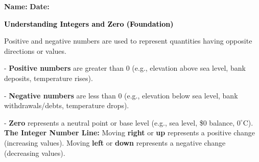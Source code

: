 \documentclass[12pt, letterpaper, fleqn]{article}
\begin{document}
\textbf{Name:} \underline{\hspace{5cm}}
\hfill
\textbf{Date:} \underline{\hspace{3cm}}\\

\begin{tcolorbox}[colback=black!10]
    \large\textcolor{black}{\textbf{Understanding Integers and Zero (Foundation)}}
\end{tcolorbox}

\vspace{0.5cm}

\noindent
Positive and negative numbers are used to represent quantities having opposite directions or values. \\

\vspace{0.5cm}

- \textbf{Positive numbers} are greater than 0 (e.g., elevation above sea level, bank deposits, temperature rises). \\
\vspace{0.5cm}

- \textbf{Negative numbers} are less than 0 (e.g., elevation below sea level, bank withdrawals/debts, temperature drops). \\
\vspace{0.5cm}

- \textbf{Zero} represents a neutral point or base level (e.g., sea level, \$0 balance, $0^\circ\text{C}$).
\vspace{1cm}
\vspace{3mm}
\noindent
\textbf{The Integer Number Line:} Moving \textbf{right} or \textbf{up} represents a positive change (increasing values). Moving \textbf{left} or \textbf{down} represents a negative change (decreasing values).

\begin{center}
\end{center}
\vspace{2mm}
\end{document}
